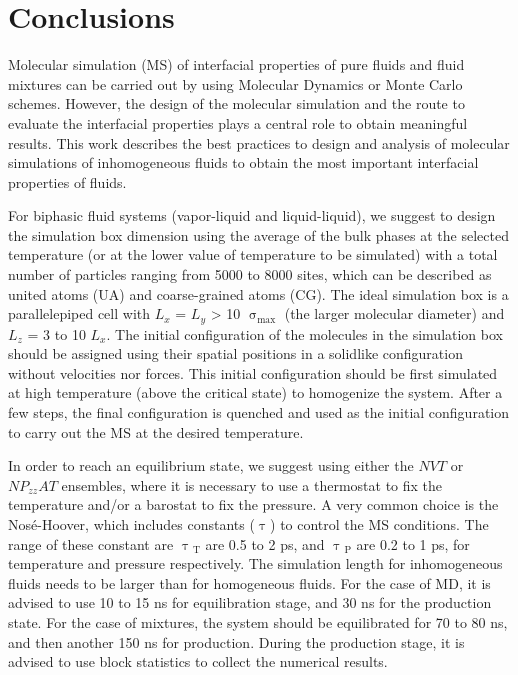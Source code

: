 \documentclass[9pt,bestpractices]{livecoms}
\begin{document}
\section{Conclusions}
Molecular simulation (MS) of interfacial properties of pure fluids and fluid
mixtures can be carried out by using Molecular Dynamics or Monte Carlo
schemes. However, the design of the molecular simulation and the route to
evaluate the interfacial properties plays a central role to obtain meaningful
results. This work describes the best practices to design and analysis of
molecular simulations of inhomogeneous fluids to obtain the most important
interfacial properties of fluids.

For biphasic fluid systems (vapor-liquid and liquid-liquid), we suggest to
design the simulation box dimension using the average of the bulk phases at the
selected temperature (or at the lower value of temperature to be simulated)
with a total number of particles ranging from 5000 to 8000 sites, which can be
described as united atoms (UA) and coarse-grained atoms (CG). The ideal
simulation box is a parallelepiped cell with $L_{x}$
= $L_{y}$ {\textgreater} 10 ${\upsigma}_{\mathrm{max}}$ (the larger
molecular diameter) and $L_{z}$ = 3 to 10
$L_{x}$. The initial configuration of the molecules in
the simulation box should be assigned using their spatial positions in
a solidlike configuration without velocities nor forces. This initial
configuration should be first simulated at high temperature (above the critical
state) to homogenize the system. After a few steps, the final configuration is
quenched and used as the initial configuration to carry out the MS at the
desired temperature.

In order to reach an equilibrium state, we suggest using either the $NVT$ or
$NP_{zz}AT$ ensembles, where it is necessary to use
a thermostat to fix the temperature and/or a barostat to fix the pressure. A
very common choice is the Nos\'{e}-Hoover, which includes constants
({${\uptau}$}) to control the MS conditions. The range of these constant are
{${\uptau}$}$_{\mathrm{T}}$ are 0.5 to 2 ps, and
{${\uptau}$}$_{\mathrm{P}}$ are 0.2 to 1 ps, for temperature and pressure respectively. The simulation
length for inhomogeneous fluids needs to be larger than for homogeneous fluids.
For the case of MD, it is advised to use 10 to 15 ns for equilibration stage,
and 30 ns for the production state. For the case of mixtures, the system should
be equilibrated for 70 to 80 ns, and then another 150 ns for production. During
the production stage, it is advised to use block statistics to collect the
numerical results.
\end{document}
